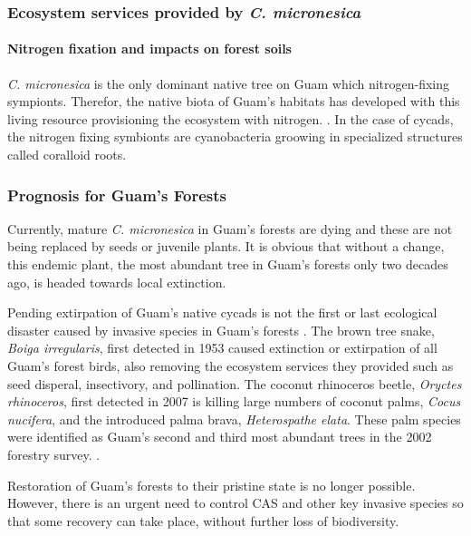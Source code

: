 \documentclass[12pt,letterpaper,english,bibliography=totocnumbered, abstract=on]{scrartcl}
\begin{document}
\subsubsection{Ecosystem services provided by \textit{C. micronesica}}

\paragraph{Nitrogen fixation and impacts on forest soils}

\textit{C. micronesica} is the only dominant native tree on Guam which nitrogen-fixing sympionts. Therefor, the native biota of Guam's habitats has developed with this living resource provisioning the ecosystem with nitrogen. \parencite{marlerArthropodInvasionDisrupts2011}. In the case of cycads, the nitrogen fixing symbionts are cyanobacteria groowing in specialized structures called coralloid roots.  

\subsubsection{Prognosis for Guam's Forests} 

Currently, mature \textit{C. micronesica} in Guam's forests are dying and these are not being replaced by seeds or juvenile plants. It is obvious that without a change, this endemic plant, the most abundant tree in Guam's forests only two decades ago, is headed towards local extinction.

Pending extirpation of Guam's native cycads is not the first or last ecological disaster caused by invasive species in Guam's forests \parencite{moore_failed_2018}. The brown tree snake, \textit{Boiga irregularis}, first detected in 1953 caused extinction or extirpation of all Guam's forest birds, also removing the ecosystem services they provided such as seed disperal, insectivory, and pollination. The coconut rhinoceros beetle, \textit{Oryctes rhinoceros}, first detected in 2007 is killing large numbers of coconut palms, \textit{Cocus nucifera}, and the introduced palma brava, \textit{Heterospathe elata}. These palm species were identified as Guam's second and third most abundant trees in the 2002 forestry survey. \parencite{donnegon_guams_2004}.

Restoration of Guam's forests to their pristine state is no longer possible. However, there is an urgent need to control CAS and other key invasive species so that some recovery can take place, without further loss of biodiversity. 
\end{document}
